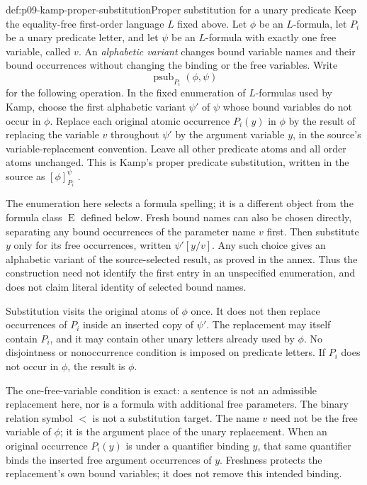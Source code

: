 \begin{hbdefinition}{def:p09-kamp-proper-substitution}{Proper substitution for a unary predicate}
Keep the equality-free first-order language \(L\) fixed above. Let
\(\phi\) be an \(L\)-formula, let \(P_i\) be a unary predicate letter,
and let \(\psi\) be an \(L\)-formula with exactly one free variable,
called \(v\). An \emph{alphabetic variant} changes bound variable names
and their bound occurrences without changing the binding or the free
variables. Write
\[
 \operatorname{psub}_{P_i}(\phi,\psi)
\]
for the following operation. In the fixed enumeration of \(L\)-formulas
used by Kamp, choose the first alphabetic variant \(\psi'\) of
\(\psi\) whose bound variables do not occur in \(\phi\). Replace each
original atomic occurrence \(P_i(y)\) in \(\phi\) by the result of
replacing the variable \(v\) throughout \(\psi'\) by the argument
variable \(y\), in the source's variable-replacement convention.
Leave all other predicate atoms and all order
atoms unchanged. This is Kamp's proper predicate substitution, written in
the source as \([\phi]^{\psi}_{P_i}\)
\cite[ch.~III, def.~1, p.~40]{Kamp1968}.

The enumeration here selects a formula spelling; it is a different object
from the formula class \(\operatorname{E}\) defined below. Fresh bound
names can also be chosen directly, separating any bound occurrences of
the parameter name \(v\) first. Then substitute \(y\) only for its
free occurrences, written \(\psi'[y/v]\). Any such choice gives an
alphabetic variant of the source-selected result, as proved in the annex.
Thus the construction need not identify the first entry in an unspecified
enumeration, and does not claim literal identity of selected bound names.

Substitution visits the original atoms of \(\phi\) once. It does not
then replace occurrences of \(P_i\) inside an inserted copy of
\(\psi'\). The replacement may itself contain \(P_i\), and it may
contain other unary letters already used by \(\phi\). No disjointness
or nonoccurrence condition is imposed on predicate letters. If \(P_i\)
does not occur in \(\phi\), the result is \(\phi\).

The one-free-variable condition is exact: a sentence is not an admissible
replacement here, nor is a formula with additional free parameters. The
binary relation symbol \(<\) is not a substitution target. The name
\(v\) need not be the free variable of \(\phi\); it is the argument
place of the unary replacement. When an original occurrence \(P_i(y)\)
is under a quantifier binding \(y\), that same quantifier binds the
inserted free argument occurrences of \(y\). Freshness protects the
replacement's own bound variables; it does not remove this intended binding.
\end{hbdefinition}

